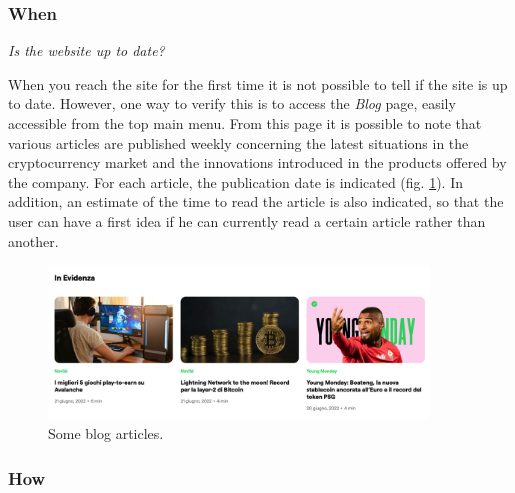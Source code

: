 \subsubsection{When}

\centerline{\textit{Is the website up to date?}}
When you reach the site for the first time it is not possible to tell if 
the site is up to date. However, one way to verify this is to access the 
\textit{Blog} page, easily accessible from the top main menu. From this 
page it is possible to note that various articles are published weekly 
concerning the latest situations in the cryptocurrency market and the 
innovations introduced in the products offered by the company. For each 
article, the publication date is indicated (fig. \ref{fig:blog}). In 
addition, an estimate of the time to read the article is also indicated, 
so that the user can have a first idea if he can currently read a certain 
article rather than another.

\begin{figure}[H]
	\centering
	\includegraphics[width=0.90\textwidth]{res/images/blog-1.png}
	\caption{Some blog articles.}
	\label{fig:blog}
\end{figure}

\subsubsection{How}

